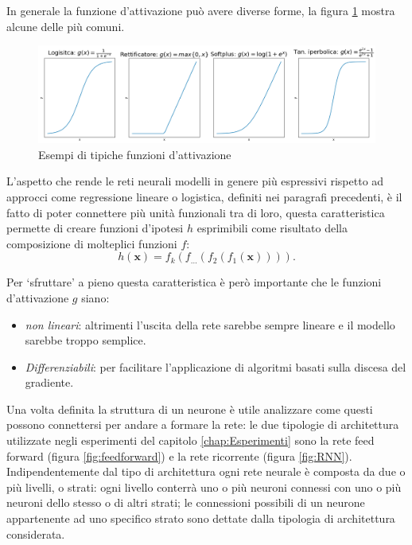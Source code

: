 \documentclass[../../main.tex]{subfiles}
\begin{document}
In generale la funzione d'attivazione può avere diverse forme, la figura \ref{fig:activations} mostra alcune delle più comuni.

\begin{figure}[H]
    \centering
    \includegraphics[width=\textwidth]{immagini/4_2/activation_func.png}
    \caption{Esempi di tipiche funzioni d'attivazione}
    \label{fig:activations}
\end{figure}

L'aspetto che rende le reti neurali modelli in genere più espressivi rispetto ad approcci come regressione lineare o logistica, definiti nei paragrafi precedenti, è il fatto di poter connettere più unità funzionali tra di loro, questa caratteristica permette di creare funzioni d'ipotesi $h$ esprimibili come risultato della composizione di molteplici funzioni $f$:
\[h(\boldsymbol{x}) = f_k\left(f_{\dots}\left(f_2\left(f_1(\boldsymbol{x})\right)\right)\right).\]

Per  `sfruttare' a pieno questa caratteristica è però importante che le funzioni d'attivazione $g$ siano:
\begin{itemize}
    \item \textit{non lineari}: altrimenti l’uscita della rete sarebbe sempre lineare e il modello sarebbe troppo semplice.
    \item \textit{Differenziabili}: per facilitare l'applicazione di algoritmi basati sulla discesa del gradiente.
\end{itemize}

Una volta definita la struttura di un neurone è utile analizzare come questi possono connettersi per andare a formare la rete: le due tipologie di architettura utilizzate negli esperimenti del capitolo \ref{chap:Esperimenti} sono la rete feed forward (figura \ref{fig:feedforward}) e la rete ricorrente (figura \ref{fig:RNN}). Indipendentemente dal tipo di architettura ogni rete neurale è composta da due o più livelli, o strati: ogni livello conterrà uno o più neuroni connessi con uno o più neuroni dello stesso o di altri strati; le connessioni possibili di un neurone appartenente ad uno specifico strato sono dettate dalla tipologia di architettura considerata.
\end{document}
